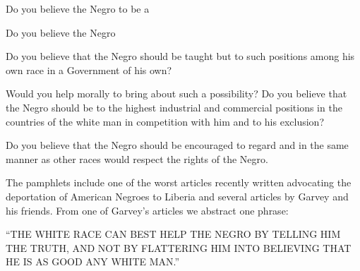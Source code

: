 \documentclass[letterpaper,10pt,english]{jupyterBook}
\begin{document}
\sphinxAtStartPar
Do you believe the Negro to be a 

\sphinxAtStartPar
Do you believe the Negro 

\sphinxAtStartPar
Do you believe that the Negro should be taught  but to such positions among his own race in a Government of his own?

\sphinxAtStartPar
Would you help morally  to bring about such a possibility? Do you believe that the Negro should be  to the highest industrial and commercial positions in the countries of the white man in competition with him and to his exclusion?

\sphinxAtStartPar
Do you believe that the Negro should be encouraged to regard and  in the same manner as other races would respect the rights of the Negro.

\sphinxAtStartPar
The pamphlets include one of the worst articles recently written  advocating the deportation of American Negroes to Liberia and several articles by Garvey and his friends. From one of Garvey’s articles we abstract one phrase:

\sphinxAtStartPar
“THE WHITE RACE CAN BEST HELP THE NEGRO BY TELLING HIM THE TRUTH, AND NOT BY FLATTERING HIM INTO BELIEVING THAT HE IS AS GOOD ANY WHITE MAN.”
\end{document}
